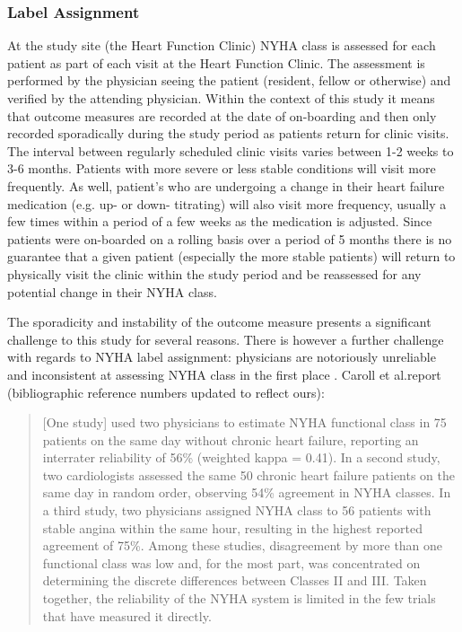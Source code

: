 \documentclass[]{article}
\begin{document}
\subsubsection{Label Assignment}

At the study site (the Heart Function Clinic) NYHA class is assessed for each patient as part of each visit at the Heart Function Clinic. The assessment is performed by the physician seeing the patient (resident, fellow or otherwise) and verified by the attending physician. Within the context of this study it means that outcome measures are recorded at the date of on-boarding and then only recorded sporadically during the study period as patients return for clinic visits. The interval between regularly scheduled clinic visits varies between 1-2 weeks to 3-6 months. Patients with more severe or less stable conditions will visit more frequently. As well, patient's who are undergoing a change in their heart failure medication (e.g. up- or down- titrating) will also visit more frequency, usually a few times within a period of a few weeks as the medication is adjusted. Since patients were on-boarded on a rolling basis over a period of 5 months there is no guarantee that a given patient (especially the more stable patients) will return to physically visit the clinic within the study period and be reassessed for any potential change in their NYHA class. %

The sporadicity and instability of the outcome measure presents a significant challenge to this study for several reasons. There is however a further challenge with regards to NYHA label assignment: physicians are notoriously unreliable and inconsistent at assessing NYHA class in the first place \cite{Carroll2014,Goldman1981a,Christensen2006,Raphael2007a,Kubo2004}. Caroll et al.\@ report (bibliographic reference numbers updated to reflect ours):

\blockquote{[One study] used two physicians to estimate NYHA functional class in 75 patients on the same day without chronic heart failure, reporting an interrater reliability of 56\% (weighted kappa = 0.41)\cite{Goldman1981a}. In a second study, two cardiologists assessed the same 50 chronic heart failure patients on the same day in random order, observing 54\% agreement in NYHA classes\cite{Raphael2007a}. In a third study, two physicians assigned NYHA class to 56 patients with stable angina within the same hour, resulting in the highest reported agreement of 75\%\cite{Christensen2006}. Among these studies, disagreement by more than one functional class was low and, for the most part, was concentrated on determining the discrete differences between Classes II and III. Taken together, the reliability of the NYHA system is limited in the few trials that have measured it directly. \cite{Carroll2014}}
\end{document}
